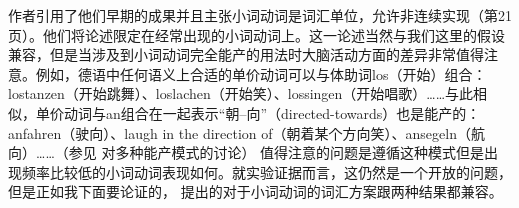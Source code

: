 \begin{exe}
\begin{xlist}[iv.]
\begin{exe}
\begin{xlist}[iv.]
作者引用了他们早期的成果\citep*{CSP2010a}并且主张小词动词是词汇单位，允许非连续实现（第21页）。他们将论述限定在经常出现的小词动词上。这一论述当然与我们这里的假设兼容，但是当涉及到小词动词完全能产的用法时大脑活动方面的差异非常值得注意。例如，德语中任何语义上合适的单价动词可以与体助词los（开始）组合：lostanzen（开始跳舞）、loslachen（开始笑）、lossingen（开始唱歌）……与此相似，单价动词与an组合在一起表示“朝--向”（directed-towards）也是能产的：anfahren（驶向）、laugh in the direction of（朝着某个方向笑）、ansegeln（航向）……（参见 对多种能产模式的讨论）
值得注意的问题是遵循这种模式但是出现频率比较低的小词动词表现如何。就实验证据而言，这仍然是一个开放的问题，但是正如我下面要论证的， \citet{Mueller2003a}提出的对于小词动词的词汇方案跟两种结果都兼容。


\end{xlist}
\end{exe}
\end{xlist}
\end{exe}
